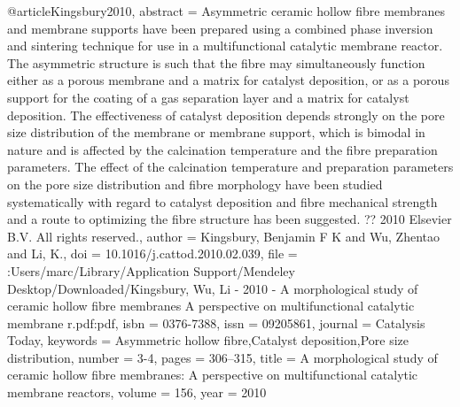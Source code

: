 @article{Kingsbury2010,
abstract = {Asymmetric ceramic hollow fibre membranes and membrane supports have been prepared using a combined phase inversion and sintering technique for use in a multifunctional catalytic membrane reactor. The asymmetric structure is such that the fibre may simultaneously function either as a porous membrane and a matrix for catalyst deposition, or as a porous support for the coating of a gas separation layer and a matrix for catalyst deposition. The effectiveness of catalyst deposition depends strongly on the pore size distribution of the membrane or membrane support, which is bimodal in nature and is affected by the calcination temperature and the fibre preparation parameters. The effect of the calcination temperature and preparation parameters on the pore size distribution and fibre morphology have been studied systematically with regard to catalyst deposition and fibre mechanical strength and a route to optimizing the fibre structure has been suggested. ?? 2010 Elsevier B.V. All rights reserved.},
author = {Kingsbury, Benjamin F K and Wu, Zhentao and Li, K.},
doi = {10.1016/j.cattod.2010.02.039},
file = {:Users/marc/Library/Application Support/Mendeley Desktop/Downloaded/Kingsbury, Wu, Li - 2010 - A morphological study of ceramic hollow fibre membranes A perspective on multifunctional catalytic membrane r.pdf:pdf},
isbn = {0376-7388},
issn = {09205861},
journal = {Catalysis Today},
keywords = {Asymmetric hollow fibre,Catalyst deposition,Pore size distribution},
number = {3-4},
pages = {306--315},
title = {{A morphological study of ceramic hollow fibre membranes: A perspective on multifunctional catalytic membrane reactors}},
volume = {156},
year = {2010}
}
